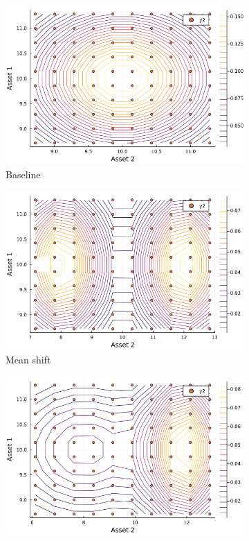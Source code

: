 \documentclass{article}
\begin{document}
\begin{figure}
    \centering
    \begin{subfigure}{0.45\textwidth}
        \includegraphics[width=\textwidth]{../plots/params/baseline/prior-grid.png}
        \caption{Baseline}
        \end{subfigure}
    \begin{subfigure}{0.45\textwidth}
        \includegraphics[width=\textwidth]{../plots/params/a2-mean-shift/prior-grid.png}
        \caption{Mean shift}
    \end{subfigure}
    \begin{subfigure}{0.45\textwidth}
        \includegraphics[width=\textwidth]{../plots/params/a2-meanvar-shift/prior-grid.png}

\end{subfigure}
\end{figure}
\end{document}

